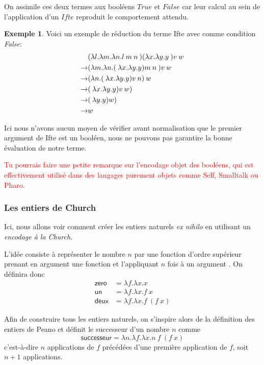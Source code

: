 \documentclass {article}
\theoremstyle{definition}
\newtheorem{example}{Exemple}
\theoremstyle{remark}
\newcommand{\todo}[1]{\textcolor{red}{#1}}
\begin{document}
On assimile ces deux termes aux booléens $True$ et $False$ car leur calcul au sein
de l'application d'un $Ifte$ reproduit le comportement attendu.

\begin{example}
  Voici un exemple de réduction du terme Ifte avec comme condition \emph{False}:
  \begin{align*}
    &(\lambda l. \lambda m. \lambda n. l\:m\:n\:)({\lambda x. \lambda y. y}\:){v}\:w \\
    \rightarrow & ({\lambda m. \lambda n. (\:\lambda x. \lambda y. y){m}\:n}\:){v}\:w \\
    \rightarrow & (\lambda n. (\:\lambda x. \lambda y. y){v}\:n)\:w \\
    \rightarrow & (\:\lambda x. \lambda y. y){v}\:w) \\
    \rightarrow & (\:\lambda y. y){w}) \\
    \rightarrow & w
  \end{align*}
\end{example}

Ici nous n'avons aucun moyen de vérifier avant normalisation que le premier
argument de Ifte est un booléen, nous ne pouvons pas garantire la bonne évaluation
de notre terme.

\todo{Tu pourrais faire une petite remarque sur l'encodage objet des
  booléens, qui est effectivement utilisé dans des langages purement
  objets comme Self, Smalltalk ou Pharo.}

\subsubsection{Les entiers de Church}

Ici, nous allons voir comment créer
les entiers naturels \textit{ex nihilo} en utilisant un \emph{encodage à
  la Church}.

L'idée consiste à représenter le nombre \(n\) par une fonction d'ordre
supérieur prenant en argument une fonction  et l'appliquant \(n\)
fois à un argument . On définira donc 
%
\begin{align*}
\mathsf{zero} &= \lambda f. \lambda x. x \\
\mathsf{un}   &= \lambda f. \lambda x. f\: x \\
\mathsf{deux} &= \lambda f. \lambda x. f\: (f\: x)
\end{align*}

Afin de construire tous les entiers naturels, on s'inspire alors de la
définition des entiers de Peano et définit le successeur d'un nombre \(n\)
comme
%
\[
\mathsf{successeur} = \lambda n. \lambda f. \lambda x. n\: f\: (f\: x)
\]
%
c'est-à-dire \(n\) applications de \(f\) précédées d'une première
application de \(f\), soit \(n+1\) applications.
\end{document}
